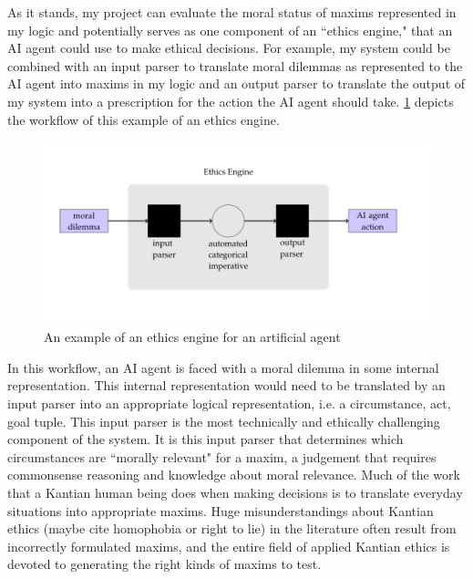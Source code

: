 \begin{isabellebody}
\begin{isamarkuptext}
As it stands, my project can evaluate the moral status of maxims represented in my logic and potentially 
serves as one component of an ``ethics engine," that an AI agent could use to make ethical decisions.
For example, my system could be combined with an input parser to translate moral dilemmas as represented 
to the AI agent into maxims in my logic and an output 
parser to translate the output of my system into a prescription for the action the AI agent should take.
\ref{fig:AIengine} depicts the workflow of this example of an ethics engine.%
\end{isamarkuptext}\isamarkuptrue%
%
\begin{figure}
\centering
\includegraphics[scale=0.4]{AI_engine.png}
\caption{An example of an ethics engine for an artificial agent} \label{fig:AIengine}
\end{figure}
%
\begin{isamarkuptext}%
In this workflow, an AI agent is faced with a moral dilemma in some internal representation. This 
internal representation would need to be translated by an input parser into an appropriate logical representation, i.e. 
a circumstance, act, goal tuple. This input parser is the most technically and ethically challenging 
component of the system. It is this input parser that determines which circumstances are ``morally relevant"
for a maxim, a judgement that requires commonsense reasoning and knowledge about moral relevance. Much 
of the work that a Kantian human being does when making decisions is to translate everyday situations 
into appropriate maxims. Huge misunderstandings about Kantian ethics (maybe cite homophobia or right 
to lie) in the literature often result from incorrectly formulated maxims, and the entire field of 
applied Kantian ethics is devoted to generating the right kinds of maxims to test. 


\end{isamarkuptext}
\end{isabellebody}
